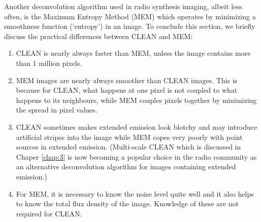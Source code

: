 Another deconvolution algorithm used in radio synthesis imaging, albeit less often, is the Maximum Entropy Method (MEM) which operates by minimizing a smoothness function (`entropy') in an image. To conclude this section, we briefly discuss the practical differences between CLEAN and MEM:
\begin{enumerate}
\item CLEAN is nearly always faster than MEM, unless the image contains more than 1 million pixels.
\item MEM images are nearly always smoother than CLEAN images. This is because for CLEAN, what happens at one pixel is not coupled to what happens to its neighbours, while MEM couples pixels together by minimizing the spread in pixel values.
\item CLEAN sometimes makes extended emission look blotchy and may introduce artificial stripes into the image while MEM copes very poorly with point sources in extended emission. (Multi-scale CLEAN which is discussed in Chaper \ref{chap:3} is now becoming a popular choice in the radio community as an alternative deconvolution algorithm for images containing extended emission.)
\item For MEM, it is necessary to know the noise level quite well and it also helps to know the total flux density of the image. Knowledge of these are not required for CLEAN.
\end{enumerate}


